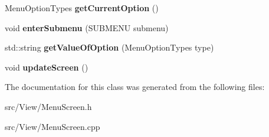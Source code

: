 \begin{DoxyCompactItemize}
\item 
Menu\+Option\+Types {\bfseries get\+Current\+Option} ()\hypertarget{classMenuScreen_aaf52feaf8f10106841287f025b1dd9ff}{}\label{classMenuScreen_aaf52feaf8f10106841287f025b1dd9ff}

\item 
void {\bfseries enter\+Submenu} (S\+U\+B\+M\+E\+NU submenu)\hypertarget{classMenuScreen_ab8674ac108437edfd162af3c1ea66d29}{}\label{classMenuScreen_ab8674ac108437edfd162af3c1ea66d29}

\item 
std\+::string {\bfseries get\+Value\+Of\+Option} (Menu\+Option\+Types type)\hypertarget{classMenuScreen_afc88d2cfcb12ddc470d02122aaa25ad9}{}\label{classMenuScreen_afc88d2cfcb12ddc470d02122aaa25ad9}

\item 
void {\bfseries update\+Screen} ()\hypertarget{classMenuScreen_a73a7ba51f2773ec6a2cbf9cf6afdd536}{}\label{classMenuScreen_a73a7ba51f2773ec6a2cbf9cf6afdd536}

\end{DoxyCompactItemize}


The documentation for this class was generated from the following files\+:\begin{DoxyCompactItemize}
\item 
src/\+View/Menu\+Screen.\+h\item 
src/\+View/Menu\+Screen.\+cpp\end{DoxyCompactItemize}
